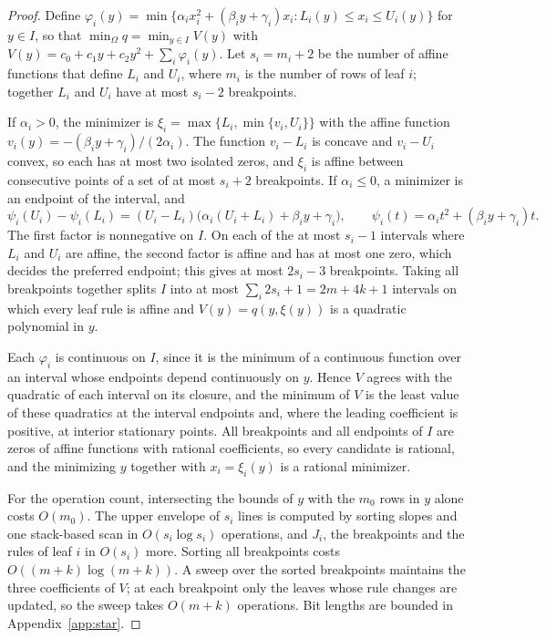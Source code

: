 \begin{proof}
Define $\varphi_i(y)=\min\{\alpha_ix_i^2+(\beta_iy+\gamma_i)x_i:L_i(y)\le x_i\le U_i(y)\}$
for $y\in I$, so that $\min_\Omega q=\min_{y\in I}V(y)$ with
$V(y)=c_0+c_1y+c_2y^2+\sum_i\varphi_i(y)$. Let $s_i=m_i+2$ be the number of
affine functions that define $L_i$ and $U_i$, where $m_i$ is the number of
rows of leaf $i$; together $L_i$ and $U_i$ have at most $s_i-2$ breakpoints.

If $\alpha_i>0$, the minimizer is $\xi_i=\max\{L_i,\min\{v_i,U_i\}\}$ with
the affine function $v_i(y)=-(\beta_iy+\gamma_i)/(2\alpha_i)$. The function
$v_i-L_i$ is concave and $v_i-U_i$ convex, so each has at most two isolated
zeros, and $\xi_i$ is affine between consecutive points of a set of at most
$s_i+2$ breakpoints. If $\alpha_i\le0$, a minimizer is an endpoint of the
interval, and
\begin{equation}\label{eq:endpoint-factor}
\psi_i(U_i)-\psi_i(L_i)=(U_i-L_i)\bigl(\alpha_i(U_i+L_i)+\beta_iy+\gamma_i\bigr),
\qquad\psi_i(t)=\alpha_it^2+(\beta_iy+\gamma_i)t .
\end{equation}
The first factor is nonnegative on $I$. On each of the at most $s_i-1$
intervals where $L_i$ and $U_i$ are affine, the second factor is affine and
has at most one zero, which decides the preferred endpoint; this gives at
most $2s_i-3$ breakpoints. Taking all breakpoints together splits $I$ into at
most $\sum_i2s_i+1=2m+4k+1$ intervals on which every leaf rule is affine and
$V(y)=q(y,\xi(y))$ is a quadratic polynomial in $y$.

Each $\varphi_i$ is continuous on $I$, since it is the minimum of a continuous
function over an interval whose endpoints depend continuously on $y$. Hence
$V$ agrees with the quadratic of each interval on its closure, and the
minimum of $V$ is the least value of these quadratics at the interval
endpoints and, where the leading coefficient is positive, at interior
stationary points. All breakpoints and all endpoints of $I$ are zeros of
affine functions with rational coefficients, so every candidate is rational,
and the minimizing $y$ together with $x_i=\xi_i(y)$ is a rational minimizer.

For the operation count, intersecting the bounds of $y$ with the $m_0$ rows
in $y$ alone costs $O(m_0)$. The upper envelope of $s_i$ lines is computed by
sorting slopes and one stack-based scan in $O(s_i\log s_i)$ operations, and
$J_i$, the breakpoints and the rules of leaf $i$ in $O(s_i)$ more. Sorting all
breakpoints costs $O((m+k)\log(m+k))$. A sweep over the sorted breakpoints
maintains the three coefficients of $V$; at each breakpoint only the leaves
whose rule changes are updated, so the sweep takes $O(m+k)$ operations. Bit
lengths are bounded in Appendix~\ref{app:star}.
\end{proof}

